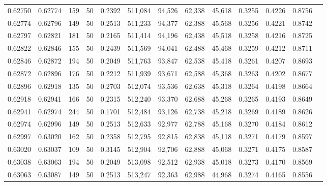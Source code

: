 \begin{tabular}{rrrrrrrrrrrrr}
0.62750 & 0.62774 &   159 &  50 &                                     0.2392 & 511,084 &  94,526 &  62,338 &  45,618 & 0.3255 & 0.4226 & 0.8756 \\
0.62774 & 0.62796 &   149 &  50 &                                     0.2513 & 511,233 &  94,377 &  62,388 &  45,568 & 0.3256 & 0.4221 & 0.8742 \\
0.62797 & 0.62821 &   181 &  50 &                                     0.2165 & 511,414 &  94,196 &  62,438 &  45,518 & 0.3258 & 0.4216 & 0.8725 \\
0.62822 & 0.62846 &   155 &  50 &                                     0.2439 & 511,569 &  94,041 &  62,488 &  45,468 & 0.3259 & 0.4212 & 0.8711 \\
0.62846 & 0.62872 &   194 &  50 &                                     0.2049 & 511,763 &  93,847 &  62,538 &  45,418 & 0.3261 & 0.4207 & 0.8693 \\
0.62872 & 0.62896 &   176 &  50 &                                     0.2212 & 511,939 &  93,671 &  62,588 &  45,368 & 0.3263 & 0.4202 & 0.8677 \\
0.62896 & 0.62918 &   135 &  50 &                                     0.2703 & 512,074 &  93,536 &  62,638 &  45,318 & 0.3264 & 0.4198 & 0.8664 \\
0.62918 & 0.62941 &   166 &  50 &                                     0.2315 & 512,240 &  93,370 &  62,688 &  45,268 & 0.3265 & 0.4193 & 0.8649 \\
0.62941 & 0.62974 &   244 &  50 &                                     0.1701 & 512,484 &  93,126 &  62,738 &  45,218 & 0.3269 & 0.4189 & 0.8626 \\
0.62974 & 0.62996 &   149 &  50 &                                     0.2513 & 512,633 &  92,977 &  62,788 &  45,168 & 0.3270 & 0.4184 & 0.8612 \\
0.62997 & 0.63020 &   162 &  50 &                                     0.2358 & 512,795 &  92,815 &  62,838 &  45,118 & 0.3271 & 0.4179 & 0.8597 \\
0.63020 & 0.63037 &   109 &  50 &                                     0.3145 & 512,904 &  92,706 &  62,888 &  45,068 & 0.3271 & 0.4175 & 0.8587 \\
0.63038 & 0.63063 &   194 &  50 &                                     0.2049 & 513,098 &  92,512 &  62,938 &  45,018 & 0.3273 & 0.4170 & 0.8569 \\
0.63063 & 0.63087 &   149 &  50 &                                     0.2513 & 513,247 &  92,363 &  62,988 &  44,968 & 0.3274 & 0.4165 & 0.8556 \\

\end{tabular}
